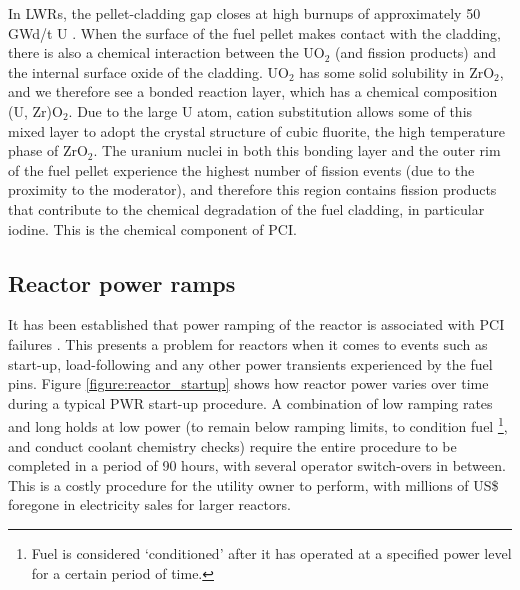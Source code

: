 In LWRs, the pellet-cladding gap closes at high burnups of approximately 50 GWd/t U \cite{Nogita1997, Suzuki2006, Rudling2008}. When the surface of the fuel pellet makes contact with the cladding, there is also a chemical interaction between the UO$_{2}$ (and fission products) and the internal surface oxide of the cladding. UO$_{2}$ has some solid solubility in ZrO$_{2}$, and we therefore see a bonded reaction layer, which has a chemical composition (U, Zr)O$_{2}$. Due to the large U atom, cation substitution allows some of this mixed layer to adopt the crystal structure of cubic fluorite, the high temperature phase of ZrO$_{2}$. The uranium nuclei in both this bonding layer and the outer rim of the fuel pellet experience the highest number of fission events (due to the proximity to the moderator), and therefore this region contains fission products that contribute to the chemical degradation of the fuel cladding, in particular iodine. This is the chemical component of PCI.

\subsection{Reactor power ramps}

It has been established that power ramping of the reactor is associated with PCI failures \cite{penn1977candu, MacDonald1979, Hardy1977198, Knaab1987}. This presents a problem for reactors when it comes to events such as start-up, load-following and any other power transients experienced by the fuel pins. Figure \ref{figure:reactor_startup} shows how reactor power varies over time during a typical PWR start-up procedure. A combination of low ramping rates and long holds at low power (to remain below ramping limits, to condition fuel \cite{billaux2005pellet}\footnote{Fuel is considered `conditioned' after it has operated at a specified power level for a certain period of time.}, and conduct coolant chemistry checks) require the entire procedure to be completed in a period of 90 hours, with several operator switch-overs in between. This is a costly procedure for the utility owner to perform, with millions of US\$ foregone in electricity sales for larger reactors.

